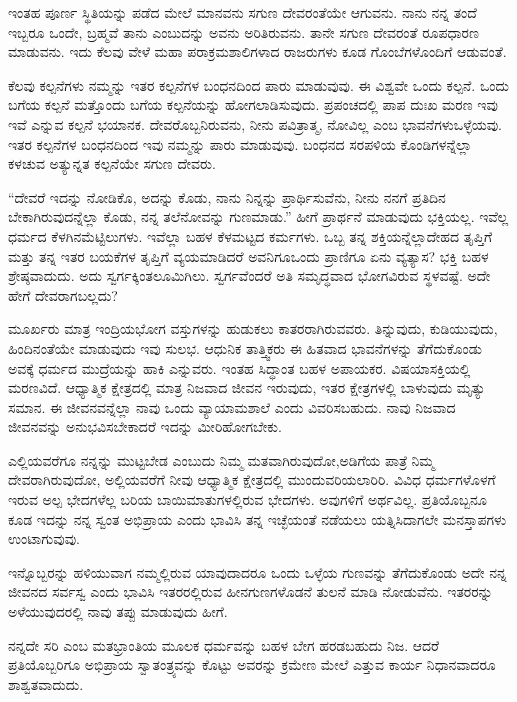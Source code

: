 ಇಂತಹ ಪೂರ್ಣ ಸ್ಥಿತಿಯನ್ನು ಪಡೆದ ಮೇಲೆ ಮಾನವನು ಸಗುಣ ದೇವರಂತೆಯೇ ಆಗುವನು. ನಾನು ನನ್ನ ತಂದೆ ಇಬ್ಬರೂ ಒಂದೇ, ಬ್ರಹ್ಮವೆ ತಾನು ಎಂಬುದನ್ನು ಅವನು ಅರಿತಿರುವನು. ತಾನೇ ಸಗುಣ ದೇವರಂತೆ ರೂಪಧಾರಣ ಮಾಡುವನು. ಇದು ಕೆಲವು ವೇಳೆ ಮಹಾ ಪರಾಕ್ರಮಶಾಲಿಗಳಾದ ರಾಜರುಗಳು ಕೂಡ ಗೊಂಬೆಗಳೊಂದಿಗೆ ಆಡುವಂತೆ.

ಕೆಲವು ಕಲ್ಪನೆಗಳು ನಮ್ಮನ್ನು ಇತರ ಕಲ್ಪನೆಗಳ ಬಂಧನದಿಂದ ಪಾರು ಮಾಡುವುವು. ಈ ವಿಶ್ವವೇ ಒಂದು ಕಲ್ಪನೆ. ಒಂದು ಬಗೆಯ ಕಲ್ಪನೆ ಮತ್ತೊಂದು ಬಗೆಯ ಕಲ್ಪನೆಯನ್ನು ಹೋಗಲಾಡಿಸುವುದು. ಪ್ರಪಂಚದಲ್ಲಿ ಪಾಪ ದುಃಖ ಮರಣ ಇವು ಇವೆ ಎನ್ನುವ ಕಲ್ಪನೆ ಭಯಾನಕ. ದೇವರೊಬ್ಬನಿರುವನು, ನೀನು ಪವಿತ್ರಾತ್ಮ, ನೋವಿಲ್ಲ ಎಂಬ ಭಾವನೆಗಳು\break ಒಳ್ಳೆಯವು. ಇತರ ಕಲ್ಪನೆಗಳ ಬಂಧನದಿಂದ ಇವು ನಮ್ಮನ್ನು ಪಾರು ಮಾಡುವುವು. ಬಂಧನದ ಸರಪಳಿಯ ಕೊಂಡಿಗಳನ್ನೆಲ್ಲಾ ಕಳಚುವ ಅತ್ಯುನ್ನತ ಕಲ್ಪನೆಯೇ ಸಗುಣ ದೇವರು.

“ದೇವರೆ ಇದನ್ನು ನೋಡಿಕೊ, ಅದನ್ನು ಕೊಡು, ನಾನು ನಿನ್ನನ್ನು ಪ್ರಾರ್ಥಿಸುವೆನು, ನೀನು ನನಗೆ ಪ್ರತಿದಿನ ಬೇಕಾಗಿರುವುದನ್ನೆಲ್ಲಾ ಕೊಡು, ನನ್ನ ತಲೆನೋವನ್ನು ಗುಣಮಾಡು.” ಹೀಗೆ ಪ್ರಾರ್ಥನೆ ಮಾಡುವುದು ಭಕ್ತಿಯಲ್ಲ. ಇವೆಲ್ಲ ಧರ್ಮದ ಕೆಳಗಿನ\break ಮೆಟ್ಟಿಲುಗಳು. ಇವೆಲ್ಲಾ ಬಹಳ ಕೆಳಮಟ್ಟದ ಕರ್ಮಗಳು. ಒಬ್ಬ ತನ್ನ ಶಕ್ತಿಯನ್ನೆಲ್ಲಾ\break ದೇಹದ ತೃಪ್ತಿಗೆ ಮತ್ತು ತನ್ನ ಇತರ ಬಯಕೆಗಳ ತೃಪ್ತಿಗೆ ವ್ಯಯಮಾಡಿದರೆ ಅವನಿಗೂ\break ಒಂದು ಪ್ರಾಣಿಗೂ ಏನು ವ್ಯತ್ಯಾಸ? ಭಕ್ತಿ ಬಹಳ ಶ್ರೇಷ್ಠವಾದುದು. ಅದು ಸ್ವರ್ಗಕ್ಕಿಂತಲೂ\break ಮಿಗಿಲು. ಸ್ವರ್ಗವೆಂದರೆ ಅತಿ ಸಮೃದ್ಧವಾದ ಭೋಗವಿರುವ ಸ್ಥಳವಷ್ಟೆ. ಅದೇ ಹೇಗೆ ದೇವರಾಗಬಲ್ಲದು?

ಮೂರ್ಖರು ಮಾತ್ರ ಇಂದ್ರಿಯಭೋಗ ವಸ್ತುಗಳನ್ನು ಹುಡುಕಲು ಕಾತರರಾಗಿರು\-ವವರು. ತಿನ್ನುವುದು, ಕುಡಿಯುವುದು, ಹಿಂದಿನಂತೆಯೇ ಮಾಡುವುದು ಇವು ಸುಲಭ. ಆಧುನಿಕ ತಾತ್ತ್ವಿಕರು ಈ ಹಿತವಾದ ಭಾವನೆಗಳನ್ನು ತೆಗೆದುಕೊಂಡು ಅವಕ್ಕೆ ಧರ್ಮದ ಮುದ್ರೆಯನ್ನು ಹಾಕಿ ಎನ್ನುವರು. ಇಂತಹ ಸಿದ್ಧಾಂತ ಬಹಳ ಅಪಾಯಕರ. ವಿಷಯಾಸಕ್ತಿ\-ಯಲ್ಲಿ ಮರಣವಿದೆ. ಆಧ್ಯಾತ್ಮಿಕ ಕ್ಷೇತ್ರದಲ್ಲಿ ಮಾತ್ರ ನಿಜವಾದ ಜೀವನ ಇರುವುದು, ಇತರ ಕ್ಷೇತ್ರಗಳಲ್ಲಿ ಬಾಳುವುದು ಮೃತ್ಯು ಸಮಾನ. ಈ ಜೀವನವನ್ನೆಲ್ಲಾ ನಾವು ಒಂದು ವ್ಯಾಯಾಮಶಾಲೆ ಎಂದು ವಿವರಿಸಬಹುದು. ನಾವು ನಿಜವಾದ ಜೀವನವನ್ನು ಅನುಭವಿಸಬೇಕಾದರೆ ಇದನ್ನು ಮೀರಿಹೋಗಬೇಕು.

ಎಲ್ಲಿಯವರೆಗೂ ನನ್ನನ್ನು ಮುಟ್ಟಬೇಡ ಎಂಬುದು ನಿಮ್ಮ ಮತವಾಗಿರುವುದೋ,\break ಅಡಿಗೆಯ ಪಾತ್ರೆ ನಿಮ್ಮ ದೇವರಾಗಿರುವುದೋ, ಅಲ್ಲಿಯವರೆಗೆ ನೀವು ಆಧ್ಯಾತ್ಮಿಕ ಕ್ಷೇತ್ರದಲ್ಲಿ ಮುಂದುವರಿಯಲಾರಿರಿ. ವಿವಿಧ ಧರ್ಮಗಳೊಳಗೆ ಇರುವ ಅಲ್ಪ ಭೇದಗಳೆಲ್ಲ ಬರಿಯ ಬಾಯಿಮಾತುಗಳಲ್ಲಿರುವ ಭೇದಗಳು. ಅವುಗಳಿಗೆ ಅರ್ಥವಿಲ್ಲ. ಪ್ರತಿಯೊಬ್ಬನೂ ಕೂಡ ಇದನ್ನು ನನ್ನ ಸ್ವಂತ ಅಭಿಪ್ರಾಯ ಎಂದು ಭಾವಿಸಿ ತನ್ನ ಇಚ್ಛೆಯಂತೆ ನಡೆಯಲು ಯತ್ನಿಸಿದಾಗಲೇ ಮನಸ್ತಾಪಗಳು ಉಂಟಾಗುವುವು.

ಇನ್ನೊಬ್ಬರನ್ನು ಹಳಿಯುವಾಗ ನಮ್ಮಲ್ಲಿರುವ ಯಾವುದಾದರೂ ಒಂದು ಒಳ್ಳೆಯ ಗುಣವನ್ನು ತೆಗೆದುಕೊಂಡು ಅದೇ ನನ್ನ ಜೀವನದ ಸರ್ವಸ್ವ ಎಂದು ಭಾವಿಸಿ ಇತರರಲ್ಲಿರುವ ಹೀನಗುಣಗಳೊಡನೆ ತುಲನೆ ಮಾಡಿ ನೋಡುವೆನು. ಇತರರನ್ನು ಅಳೆಯುವುದರಲ್ಲಿ ನಾವು ತಪ್ಪು ಮಾಡುವುದು ಹೀಗೆ.

ನನ್ನದೇ ಸರಿ ಎಂಬ ಮತಭ್ರಾಂತಿಯ ಮೂಲಕ ಧರ್ಮವನ್ನು ಬಹಳ ಬೇಗ ಹರಡಬಹುದು ನಿಜ. ಆದರೆ ಪ್ರತಿಯೊಬ್ಬರಿಗೂ ಅಭಿಪ್ರಾಯ ಸ್ವಾತಂತ್ರ್ಯವನ್ನು ಕೊಟ್ಟು ಅವರನ್ನು ಕ್ರಮೇಣ ಮೇಲೆ ಎತ್ತುವ ಕಾರ್ಯ ನಿಧಾನವಾದರೂ ಶಾಶ್ವತವಾದುದು.

